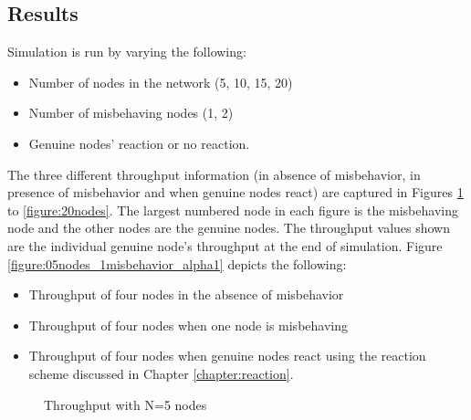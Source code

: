 \documentclass[12pt,letterpaper,english]{article}
\begin{document}
\subsection{Results}
\label{section:results}
Simulation is run by varying the following:
\begin{itemize}
\item Number of nodes in the network (5, 10, 15, 20)
\item Number of misbehaving nodes (1, 2)
\item Genuine nodes' reaction or no reaction.
\end{itemize}
The three different throughput information (in absence of misbehavior, in presence of misbehavior and when genuine nodes react) are captured in Figures \ref{figure:05nodes} to \ref{figure:20nodes}. The largest numbered node in each figure is the misbehaving node and the other nodes are the genuine nodes. The throughput values shown are the individual genuine node's throughput at the end of simulation.
Figure \ref{figure:05nodes_1misbehavior_alpha1} depicts the following:
\begin{itemize}
\item Throughput of four nodes in the absence of misbehavior
\item Throughput of four nodes when one node is misbehaving
\item Throughput of four nodes when genuine nodes react using the reaction scheme discussed in Chapter  \ref{chapter:reaction}. 
\end{itemize}
\begin{figure}[H]
\centering
{}
\caption{Throughput with N=5 nodes}
\label{figure:05nodes}
\end{figure}
\end{document}
